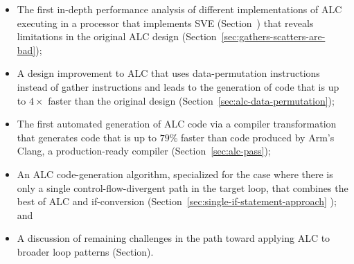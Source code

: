 \begin{itemize}

\item The first in-depth performance analysis of different implementations of ALC executing in a processor that implements SVE (Section~) that reveals limitations in the original ALC design (Section~\ref{sec:gathers-scatters-are-bad});
\item A design improvement to ALC that uses data-permutation instructions instead of gather instructions and leads to the generation of code that is up to $4\times$ faster than the original design (Section~\ref{sec:alc-data-permutation});
\item The first automated generation of ALC code via a  compiler transformation that generates code that is up to $79\%$ faster than \ifconverted code produced by Arm's Clang, a production-ready compiler (Section~\ref{sec:alc-pass});
\item An ALC code-generation algorithm, specialized for the case where there is only a single control-flow-divergent path in the target loop, that combines the best of ALC and if-conversion (Section~\ref{sec:single-if-statement-approach} ); and 
\item A discussion of remaining challenges in the path toward applying ALC to broader loop patterns (Section).

\end{itemize}

